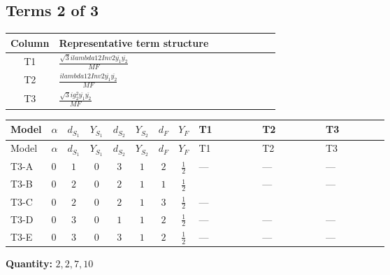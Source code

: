\documentclass[8pt]{article}
\begin{document}
\begin{landscape}
\subsection*{Terms 2 of 3}
\begin{center}
\begin{tabular}{@{}c >{\raggedright\arraybackslash}p{0.82\linewidth}@{}}
\toprule
Column & Representative term structure \\
\midrule
T1 & \(\displaystyle \frac{\sqrt{3} i lambda12Inv2 \overline{y_{1}} \overline{y_{2}}}{MF}\) \\
\midrule
T2 & \(\displaystyle \frac{i lambda12Inv2 \overline{y_{1}} \overline{y_{2}}}{MF}\) \\
\midrule
T3 & \(\displaystyle \frac{\sqrt{3} i g_{2}^{2} \overline{y_{1}} \overline{y_{2}}}{MF}\) \\
\midrule
\bottomrule
\end{tabular}
\end{center}
\smallskip
\tiny
\begin{longtable}{@{}llcccccc >{\raggedright\arraybackslash}p{0.21\linewidth} >{\raggedright\arraybackslash}p{0.21\linewidth} >{\raggedright\arraybackslash}p{0.21\linewidth}@{}}
\toprule
Model & $\alpha$ & $d_{S_1}$ & $Y_{S_1}$ & $d_{S_2}$ & $Y_{S_2}$ & $d_F$ & $Y_F$ & T1 & T2 & T3 \\
\midrule
\endfirsthead
\toprule
Model & $\alpha$ & $d_{S_1}$ & $Y_{S_1}$ & $d_{S_2}$ & $Y_{S_2}$ & $d_F$ & $Y_F$ & T1 & T2 & T3 \\
\midrule
\endhead
T3-A & $0$ & $1$ & $0$ & $3$ & $1$ & $2$ & $\frac{1}{2}$ & --- & --- & --- \\
\midrule
T3-B & $0$ & $2$ & $0$ & $2$ & $1$ & $1$ & $\frac{1}{2}$ & \scriptsize\adjustbox{max width=\linewidth}{$\begin{gathered} \frac{\sqrt{3} i lambda12Inv2 \overline{y_{1}} \overline{y_{2}}}{3 MF}\end{gathered}$} & --- & --- \\
\midrule
T3-C & $0$ & $2$ & $0$ & $2$ & $1$ & $3$ & $\frac{1}{2}$ & --- & \scriptsize\adjustbox{max width=\linewidth}{$\begin{gathered} - \frac{i lambda12Inv2 \overline{y_{1}} \overline{y_{2}}}{3 MF}\end{gathered}$} & \scriptsize\adjustbox{max width=\linewidth}{$\begin{gathered} - \frac{\sqrt{3} i g_{2}^{2} \overline{y_{1}} \overline{y_{2}}}{4 MF}\end{gathered}$} \\
\midrule
T3-D & $0$ & $3$ & $0$ & $1$ & $1$ & $2$ & $\frac{1}{2}$ & --- & --- & --- \\
\midrule
T3-E & $0$ & $3$ & $0$ & $3$ & $1$ & $2$ & $\frac{1}{2}$ & --- & --- & --- \\
\midrule
\bottomrule
\end{longtable}
\clearpage
\noindent\textbf{Quantity: }$\mathrm{2,2,7,10}$\par\smallskip

\end{landscape}
\end{document}
